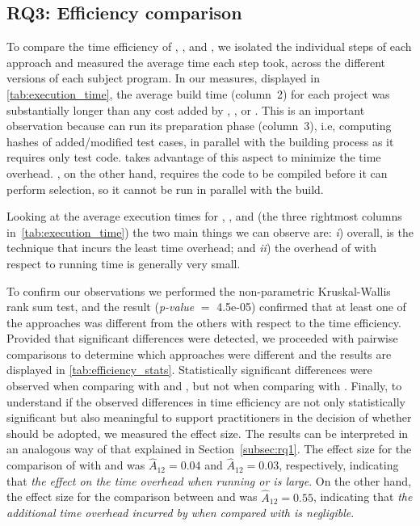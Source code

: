 \subsection{RQ3: Efficiency comparison}
\label{subsec:rq3}
To compare the time efficiency of \ek, \fs, and \fz, 
we isolated the individual steps of each approach and measured the average time each step took, across the different versions of each subject program. 
In our measures, displayed in \autoref{tab:execution_time}, 
the average build time (column~2) for each project was substantially longer than any cost added by \ek, \fs, or \fz.
This is an important observation because \fs can run its preparation phase (column~3), i.e, computing hashes of added/modified test cases, in parallel with the building process as it requires only test code.
\fz takes advantage of this aspect to minimize the time overhead. %
\ek, on the other hand, requires the code to be compiled before it can perform selection, so it cannot be run in parallel with the build.

%
%
%

Looking at the average execution times for \fs, \ek, and \fz 
(the three rightmost columns in~\autoref{tab:execution_time}) 
the two main things we can observe are: 
\textit{i}) overall, \fs is the technique that incurs the least time overhead;
and \textit{ii}) the overhead of \fz with respect to \ek running time is generally very small.

To confirm our observations we performed the non-parametric Kruskal-Wallis rank sum test, 
and the result (\textit{p-value} $=$ 4.5e-05) confirmed that at least one of the approaches was different from the others with respect to the time efficiency.
Provided that significant differences were detected, we proceeded with pairwise comparisons to determine which approaches were different
and the results are displayed in \autoref{tab:efficiency_stats}.
Statistically significant differences were observed when comparing \fs with \ek and \fz, but not when comparing \fz with \ek.
Finally, to understand if the observed differences in time efficiency are not only statistically significant but also meaningful to support practitioners in the decision of whether \fz should be adopted, we measured the effect size.
The results can be interpreted in an analogous way of that explained in Section~\ref{subsec:rq1}.
The effect size for the comparison of \fs with \ek and \fz was $\hat{A}_{12}=0.04$ and $\hat{A}_{12}=0.03$, respectively, indicating that \emph{the effect on the time overhead when running \ek or \fz is large}.
On the other hand, the effect size for the comparison between \fz and \ek was $\hat{A}_{12}=0.55$, indicating that \emph{the additional time overhead incurred by \fz when compared with \ek is negligible}.

